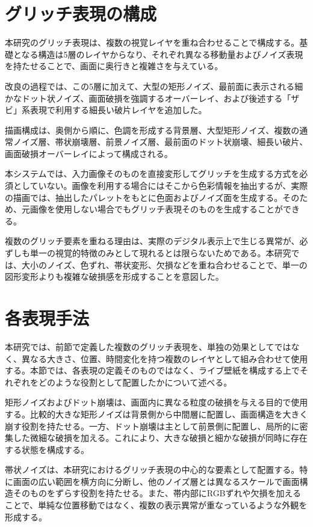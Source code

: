 \section{グリッチ表現の構成}

本研究のグリッチ表現は、複数の視覚レイヤを重ね合わせることで構成する。基礎となる構造は5層のレイヤからなり、それぞれ異なる移動量およびノイズ表現を持たせることで、画面に奥行きと複雑さを与えている。

改良の過程では、この5層に加えて、大型の矩形ノイズ、最前面に表示される細かなドット状ノイズ、画面破損を強調するオーバーレイ、および後述する「ザビ」系表現で利用する細長い破片レイヤを追加した。

描画構成は、奥側から順に、色調を形成する背景層、大型矩形ノイズ、複数の通常ノイズ層、帯状崩壊層、前景ノイズ層、最前面のドット状崩壊、細長い破片、画面破損オーバーレイによって構成される。

本システムでは、入力画像そのものを直接変形してグリッチを生成する方式を必須としていない。画像を利用する場合にはそこから色彩情報を抽出するが、実際の描画では、抽出したパレットをもとに色面およびノイズ面を生成する。そのため、元画像を使用しない場合でもグリッチ表現そのものを生成することができる。

複数のグリッチ要素を重ねる理由は、実際のデジタル表示上で生じる異常が、必ずしも単一の視覚的特徴のみとして現れるとは限らないためである。本研究では、大小のノイズ、色ずれ、帯状変形、欠損などを重ね合わせることで、単一の図形変形よりも複雑な破損感を形成することを意図した。


\section{各表現手法}

本研究では、前節で定義した複数のグリッチ表現を、単独の効果としてではなく、異なる大きさ、位置、時間変化を持つ複数のレイヤとして組み合わせて使用する。本節では、各表現の定義そのものではなく、ライブ壁紙を構成する上でそれぞれをどのような役割として配置したかについて述べる。

矩形ノイズおよびドット崩壊は、画面内に異なる粒度の破損を与える目的で使用する。比較的大きな矩形ノイズは背景側から中間層に配置し、画面構造を大きく崩す役割を持たせる。一方、ドット崩壊は主として前景側に配置し、局所的に密集した微細な破損を加える。これにより、大きな破損と細かな破損が同時に存在する状態を構成する。

帯状ノイズは、本研究におけるグリッチ表現の中心的な要素として配置する。特に画面の広い範囲を横方向に分断し、他のノイズ層とは異なるスケールで画面構造そのものをずらす役割を持たせる。また、帯内部にRGBずれや欠損を加えることで、単純な位置移動ではなく、複数の表示異常が重なっているような外観を形成する。

